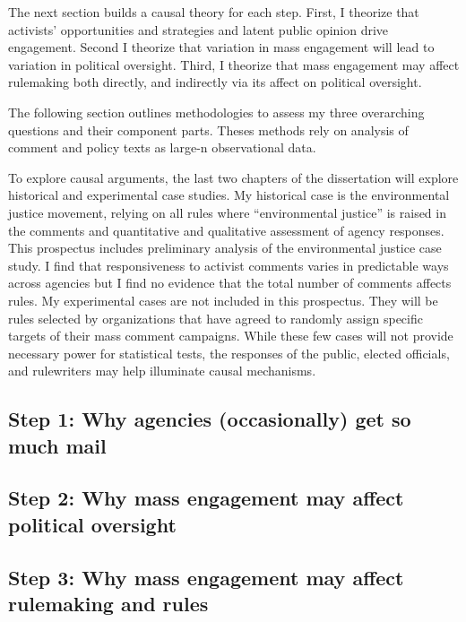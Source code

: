\documentclass{article}
\begin{document}
The next section builds a causal theory for each step. First, I theorize that activists' opportunities and strategies and latent public opinion drive engagement. Second I theorize that variation in mass engagement will lead to variation in political oversight. Third, I theorize that mass engagement may affect rulemaking both directly, and indirectly via its affect on political oversight.

The following section outlines methodologies to assess my three overarching questions and their component parts. Theses methods rely on analysis of comment and policy texts as large-n observational data. 

To explore causal arguments, the last two chapters of the dissertation will explore historical and experimental case studies. My historical case is the environmental justice movement, relying on all rules where ``environmental justice'' is raised in the comments and quantitative and qualitative assessment of agency responses. This prospectus includes preliminary analysis of the environmental justice case study. I find that responsiveness to activist comments varies in predictable ways across agencies but I find no evidence that the total number of comments affects rules. My experimental cases are not included in this prospectus. They will be rules selected by organizations that have agreed to randomly assign specific targets of their mass comment campaigns. While these few cases will not provide necessary power for statistical tests, the responses of the public, elected officials, and rulewriters may help illuminate causal mechanisms.


\subsection{Step 1: Why agencies (occasionally) get so much mail} \label{whymail-intro}


\subsection{Step 2: Why mass engagement may affect political oversight} \label{principals-intro}


\subsection{Step 3: Why mass engagement may affect rulemaking and rules} \label{influence-intro}



\end{document}
